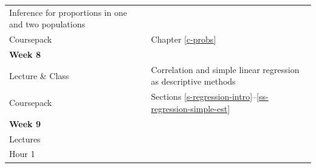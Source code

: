 \documentclass[11pt,a4paper,openany]{book}
\begin{document}
\begin{longtable}[]{@{}ll@{}}
\begin{minipage}[t]{0.76\columnwidth}
Inference for proportions in one and two populations\strut
\end{minipage}\tabularnewline
\begin{minipage}[t]{0.19\columnwidth}\raggedright\strut
Coursepack\strut
\end{minipage} & \begin{minipage}[t]{0.76\columnwidth}\raggedright\strut
Chapter \ref{c-probs}\strut
\end{minipage}\tabularnewline
\begin{minipage}[t]{0.19\columnwidth}\raggedright\strut
\textbf{Week 8}\strut
\end{minipage} & \begin{minipage}[t]{0.76\columnwidth}\raggedright\strut
\strut
\end{minipage}\tabularnewline
\begin{minipage}[t]{0.19\columnwidth}\raggedright\strut
Lecture \& Class\strut
\end{minipage} & \begin{minipage}[t]{0.76\columnwidth}\raggedright\strut
Correlation and simple linear regression as descriptive methods\strut
\end{minipage}\tabularnewline
\begin{minipage}[t]{0.19\columnwidth}\raggedright\strut
Coursepack\strut
\end{minipage} & \begin{minipage}[t]{0.76\columnwidth}\raggedright\strut
Sections \ref{s-regression-intro}--\ref{ss-regression-simple-est}\strut
\end{minipage}\tabularnewline
\begin{minipage}[t]{0.19\columnwidth}\raggedright\strut
\textbf{Week 9}\strut
\end{minipage} & \begin{minipage}[t]{0.76\columnwidth}\raggedright\strut
\strut
\end{minipage}\tabularnewline
\begin{minipage}[t]{0.19\columnwidth}\raggedright\strut
Lectures\strut
\end{minipage} & \begin{minipage}[t]{0.76\columnwidth}\raggedright\strut
\strut
\end{minipage}\tabularnewline
\begin{minipage}[t]{0.19\columnwidth}\raggedright\strut
Hour 1\strut
\end{minipage} & \begin{minipage}[t]{0.76\columnwidth}\raggedright\strut

\end{minipage}
\end{longtable}
\end{document}

